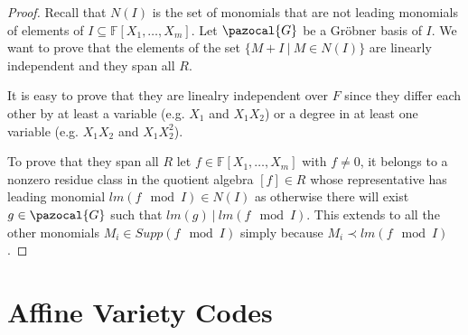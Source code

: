 \documentclass[11pt,a4paper]{report}
\theoremstyle{plain}
\theoremstyle{definition}
\newcommand{\G}{\pazocal{G}}
\begin{document}
\begin{proof}
	Recall that $N(I)$ is the set of monomials that are not leading monomials of elements of $I \subseteq \mathbb{F}[X_1,\ldots ,X_m]$. Let $\G$ be a Gr\"obner basis of $I$. We want to prove that the elements of the set $\{M + I\ |\ M\in N(I)\}$ are linearly independent and they span all $R$.
	
	It is easy to prove that they are linealry independent over $F$ since they differ each other by at least a variable (e.g. $X_1$ and $X_1X_2$) or a degree in at least one variable (e.g. $X_1X_2$ and $X_1X_2^2$).
	
	To prove that they span all $R$ let $f \in \mathbb{F}[X_1,\ldots ,X_m]$ with $f \neq 0$, it belongs to a nonzero residue class in the quotient algebra $[f] \in R$ whose representative has leading monomial $lm(f \mod I) \in N(I)$ as otherwise there will exist $g \in \G$ such that $lm(g)\ |\ lm(f \mod I)$. This extends to all the other monomials $M_i \in Supp(f \mod I)$ simply because $M_i \prec lm(f \mod I)$.
\end{proof}

\chapter{Affine Variety Codes}
\end{document}
